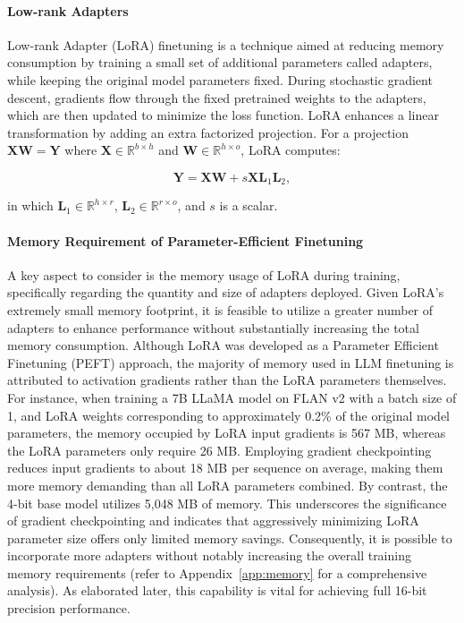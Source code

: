 \paragraph{Low-rank Adapters} Low-rank Adapter (LoRA) finetuning \citep{hu2021lora} is a technique aimed at reducing memory consumption by training a small set of additional parameters called adapters, while keeping the original model parameters fixed. During stochastic gradient descent, gradients flow through the fixed pretrained weights to the adapters, which are then updated to minimize the loss function. LoRA enhances a linear transformation by adding an extra factorized projection. For a projection ${\mathbf{X} \mathbf{W} = \mathbf{Y}}$ where $\mathbf{X}\in  \mathbb{R}^{b\times h}$ and $\mathbf{W}\in  \mathbb{R}^{h\times o}$, LoRA computes:

\begin{equation}
    \mathbf{Y} = \mathbf{X}\mathbf{W} + s\mathbf{X}\mathbf{L}_1\mathbf{L}_2,
\end{equation}

in which $\mathbf{L}_1\in  \mathbb{R}^{h\times r}$, $\mathbf{L}_2\in  \mathbb{R}^{r\times o}$, and $s$ is a scalar.

\paragraph{Memory Requirement of Parameter-Efficient Finetuning} A key aspect to consider is the memory usage of LoRA during training, specifically regarding the quantity and size of adapters deployed. Given LoRA's extremely small memory footprint, it is feasible to utilize a greater number of adapters to enhance performance without substantially increasing the total memory consumption. Although LoRA was developed as a Parameter Efficient Finetuning (PEFT) approach, the majority of memory used in LLM finetuning is attributed to activation gradients rather than the LoRA parameters themselves. For instance, when training a 7B LLaMA model on FLAN v2 with a batch size of 1, and LoRA weights corresponding to approximately 0.2\% of the original model parameters\citep{hu2021lora,liu2022few}, the memory occupied by LoRA input gradients is 567 MB, whereas the LoRA parameters only require 26 MB. Employing gradient checkpointing~\citep{chen2016training} reduces input gradients to about 18 MB per sequence on average, making them more memory demanding than all LoRA parameters combined. By contrast, the 4-bit base model utilizes 5,048 MB of memory. This underscores the significance of gradient checkpointing and indicates that aggressively minimizing LoRA parameter size offers only limited memory savings. Consequently, it is possible to incorporate more adapters without notably increasing the overall training memory requirements (refer to Appendix~\ref{app:memory} for a comprehensive analysis). As elaborated later, this capability is vital for achieving full 16-bit precision performance.

